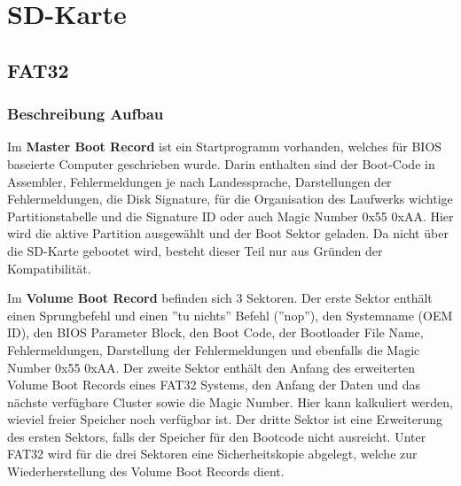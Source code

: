 \section{SD-Karte}\label{Appendix:SD_Karte}

\subsection{FAT32}\label{Appendix:FAT32}

\subsubsection{Beschreibung Aufbau}\label{Appendix:FAT32_Aufbau}

Im \textbf{Master Boot Record} ist ein Startprogramm vorhanden, welches für BIOS baseierte Computer geschrieben wurde.
Darin enthalten sind der Boot-Code in Assembler, Fehlermeldungen je nach Landessprache, Darstellungen der Fehlermeldungen, die Disk Signature, für die Organisation des Laufwerks wichtige Partitionstabelle und die Signature ID oder auch Magic Number 0x55 0xAA. Hier wird die aktive Partition ausgewählt und der Boot Sektor geladen. Da nicht über die SD-Karte gebootet wird, besteht dieser Teil nur aus Gründen der Kompatibilität.



Im \textbf{Volume Boot Record} befinden sich 3 Sektoren. Der erste Sektor enthält einen Sprungbefehl und einen ''tu nichts'' Befehl (''nop''), den Systemname (OEM ID), den BIOS Parameter Block, den Boot Code, der Bootloader File Name, Fehlermeldungen, Darstellung der Fehlermeldungen und ebenfalls die Magic Number 0x55 0xAA. Der zweite Sektor enthält den Anfang des erweiterten Volume Boot Records eines FAT32 Systems, den Anfang der Daten und das nächste verfügbare Cluster sowie die Magic Number. Hier kann kalkuliert werden, wieviel freier Speicher noch verfügbar ist. Der dritte Sektor ist eine Erweiterung des ersten Sektors, falls der Speicher für den Bootcode nicht ausreicht. Unter FAT32 wird für die drei Sektoren eine Sicherheitskopie abgelegt, welche zur Wiederherstellung des Volume Boot Records dient.

